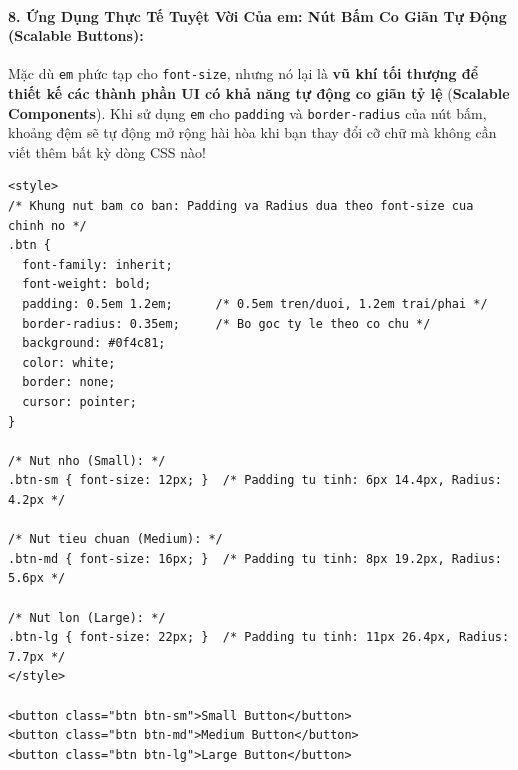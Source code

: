 \documentclass[11pt,oneside]{book}
\newcommand{\codeinline}[1]{\textcolor{accentOrange}{\texttt{#1}}}
\newcommand{\term}[1]{\textbf{\textcolor{primaryBlue}{#1}}}
\begin{document}
\paragraph{8. Ứng Dụng Thực Tế Tuyệt Vời Của em: Nút Bấm Co Giãn Tự Động (Scalable Buttons):}

Mặc dù \codeinline{em} phức tạp cho \codeinline{font-size}, nhưng nó lại là \textbf{vũ khí tối thượng để thiết kế các thành phần UI có khả năng tự động co giãn tỷ lệ} (\term{Scalable Components}). Khi sử dụng \codeinline{em} cho \codeinline{padding} và \codeinline{border-radius} của nút bấm, khoảng đệm sẽ tự động mở rộng hài hòa khi bạn thay đổi cỡ chữ mà không cần viết thêm bất kỳ dòng CSS nào!

\begin{codeWindow}
\begin{lstlisting}[language=HTML5]
<style>
/* Khung nut bam co ban: Padding va Radius dua theo font-size cua chinh no */
.btn {
  font-family: inherit;
  font-weight: bold;
  padding: 0.5em 1.2em;      /* 0.5em tren/duoi, 1.2em trai/phai */
  border-radius: 0.35em;     /* Bo goc ty le theo co chu */
  background: #0f4c81;
  color: white;
  border: none;
  cursor: pointer;
}

/* Nut nho (Small): */
.btn-sm { font-size: 12px; }  /* Padding tu tinh: 6px 14.4px, Radius: 4.2px */

/* Nut tieu chuan (Medium): */
.btn-md { font-size: 16px; }  /* Padding tu tinh: 8px 19.2px, Radius: 5.6px */

/* Nut lon (Large): */
.btn-lg { font-size: 22px; }  /* Padding tu tinh: 11px 26.4px, Radius: 7.7px */
</style>

<button class="btn btn-sm">Small Button</button>
<button class="btn btn-md">Medium Button</button>
<button class="btn btn-lg">Large Button</button>
\end{lstlisting}
\end{codeWindow}
\end{document}
